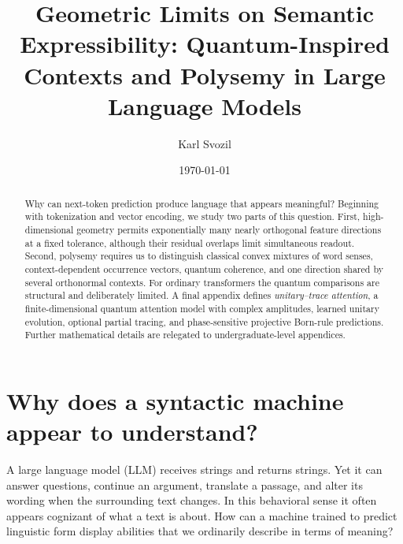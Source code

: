 \documentclass[
  aps,
  reprint,
  superscriptaddress,
  floatfix,
  nofootinbib,
  longbibliography
]{revtex4-2}
\begin{document}
\title{Geometric Limits on Semantic Expressibility: Quantum-Inspired Contexts and Polysemy in Large Language Models}

\author{Karl Svozil}

\date{\today}

\begin{abstract}
Why can next-token prediction produce language that appears meaningful?
Beginning with tokenization and vector encoding, we study two parts of this
question.  First, high-dimensional geometry permits exponentially many nearly
orthogonal feature directions at a fixed tolerance, although their residual
overlaps limit simultaneous readout.  Second, polysemy requires us to
distinguish classical convex mixtures of word senses, context-dependent
occurrence vectors, quantum coherence, and one direction shared by several
orthonormal contexts.  For ordinary transformers the quantum comparisons are
structural and deliberately limited.  A final appendix defines
\emph{unitary--trace attention}, a finite-dimensional quantum attention model
with complex amplitudes, learned unitary evolution, optional partial tracing,
and phase-sensitive projective Born-rule predictions.
Further mathematical details are
relegated to undergraduate-level appendices.
\end{abstract}

\maketitle

\section{Why does a syntactic machine appear to understand?}
\label{sec:puzzle}

A large language model (LLM) receives strings and returns strings.  Yet it can
answer questions, continue an argument, translate a passage, and alter its
wording when the surrounding text changes.  In this behavioral sense it often
appears cognizant of what a text is about.  How can a machine trained to
predict linguistic form display abilities that we ordinarily describe in
terms of meaning?
\end{document}
